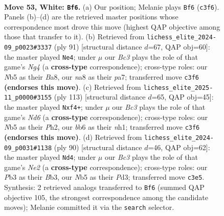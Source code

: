 \documentclass[11pt]{article}
\begin{document}
\clearpage

\begin{figure}[p]\centering
\begin{subfigure}{0.46\textwidth}\centering
\resizebox{\linewidth}{!}{%
\newchessgame
\chessboard[
  setfen={nn6/1p6/1b5k/pN1p4/6bp/PPB1P3/4P1K1/3B4 w - - 2 53},
  showmover=false,
  pgfstyle=straightmove, color=movearrow, markmove={c3-f6}
]}
\caption{}
\end{subfigure}\hfill
\begin{subfigure}{0.46\textwidth}\centering
\resizebox{\linewidth}{!}{%
\newchessgame
\chessboard[
  setfen={b7/P4k2/2p5/3p2n1/1B5p/1B5P/1P4P1/6K1 b - - 0 46},
  showmover=false,
  pgfstyle=straightmove, color=movearrow, markmove={g5-e4}
]}
\caption{}
\end{subfigure}
\\[4pt]
\begin{subfigure}{0.46\textwidth}\centering
\resizebox{\linewidth}{!}{%
\newchessgame
\chessboard[
  setfen={8/k7/P2bp3/2p2p2/2P2P2/3nB3/6Kp/7N b - - 0 57},
  showmover=false,
  pgfstyle=straightmove, color=movearrow, markmove={d3-f4}
]}
\caption{}
\end{subfigure}\hfill
\begin{subfigure}{0.46\textwidth}\centering
\resizebox{\linewidth}{!}{%
\newchessgame
\chessboard[
  setfen={8/4k3/7p/5p1b/5P1p/1BpP1P2/2P1N1K1/4b3 w - - 0 46},
  showmover=false,
  pgfstyle=straightmove, color=movearrow, markmove={e2-d4}
]}
\caption{}
\end{subfigure}
\caption{\textbf{Move 53, White: \texttt{Bf6}.} (a) Our position; Melanie plays \texttt{Bf6} (\texttt{c3f6}). Panels (b)--(d) are the retrieved master positions whose correspondence most drove this move (highest QAP objective among those that transfer to it). (b) Retrieved from \texttt{lichess\_elite\_2024-09\_p0023\#3337} (ply 91) [structural distance $d$=67, QAP obj=60]: the master played \texttt{Ne4}; under $\mu$ our \emph{Bc3} plays the role of that game's \emph{Ng4} (a \textbf{cross-type} correspondence); cross-type roles: our \emph{N}b5 as their \emph{B}a8, our \emph{n}a8 as their \emph{p}a7; transferred move \texttt{c3f6} \textbf{(endorses this move)}. (c) Retrieved from \texttt{lichess\_elite\_2025-11\_p0000\#3155} (ply 113) [structural distance $d$=65, QAP obj=45]: the master played \texttt{Nxf4+}; under $\mu$ our \emph{Bc3} plays the role of that game's \emph{Nd6} (a \textbf{cross-type} correspondence); cross-type roles: our \emph{N}b5 as their \emph{P}h2, our \emph{b}b6 as their \emph{n}h1; transferred move \texttt{c3f6} \textbf{(endorses this move)}. (d) Retrieved from \texttt{lichess\_elite\_2024-09\_p0031\#1138} (ply 90) [structural distance $d$=46, QAP obj=62]: the master played \texttt{Nd4}; under $\mu$ our \emph{Bc3} plays the role of that game's \emph{Ne2} (a \textbf{cross-type} correspondence); cross-type roles: our \emph{P}b3 as their \emph{B}b3, our \emph{N}b5 as their \emph{P}d3; transferred move \texttt{c3e5}. Synthesis: 2 retrieved analogs transferred to \texttt{Bf6} (summed QAP objective 105, the strongest correspondence among the candidate moves); Melanie committed it via the \texttt{search} selector.}
\label{fig:thought-m104}
\end{figure}
\end{document}
